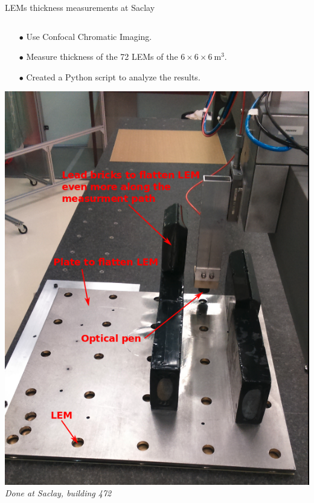 \documentclass[10pt]{beamer}
\begin{document}
\begin{frame}{LEMs thickness measurements at Saclay}
\begin{scriptsize}
\begin{columns}
\begin{column}{0.5\textwidth}
    				\begin{itemize}
    					\item[$\bullet$] Use Confocal Chromatic Imaging.
    					\item[$\bullet$] Measure thickness of the 72 LEMs of the $6 \times 6 \times \SI{6}{\meter\cubed}$.
    					\item[$\bullet$] Created a Python script to analyze the results.
    				\end{itemize}
    				\centering \includegraphics[height=0.5\textheight]{figures/666/plate_and_bricks.png}\\
    				\flushleft
   					\textit{Done at Saclay, building 472}
    			\end{column}
    		\end{columns}
    	\end{scriptsize}
    \end{frame}
    
\end{document}
